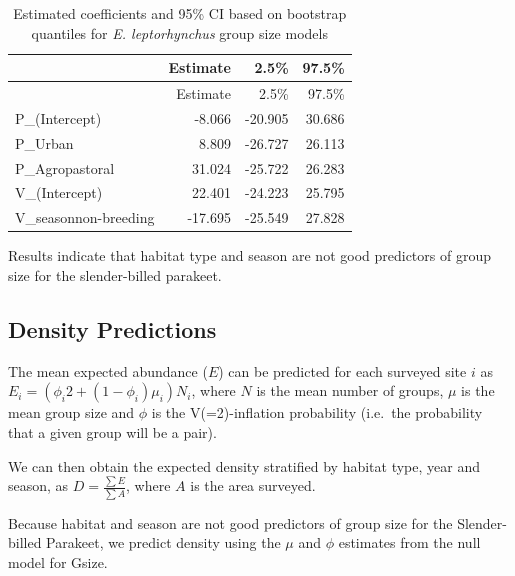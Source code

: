 \documentclass[]{article}
\begin{document}
\begin{longtable}[]{@{}lrrr@{}}
\caption{Estimated coefficients and 95\% CI based on bootstrap quantiles
for \textit{E. leptorhynchus} group size models}\tabularnewline
\toprule
& Estimate & 2.5\% & 97.5\%\tabularnewline
\midrule
\endfirsthead
\toprule
& Estimate & 2.5\% & 97.5\%\tabularnewline
\midrule
\endhead
P\_(Intercept) & -8.066 & -20.905 & 30.686\tabularnewline
P\_Urban & 8.809 & -26.727 & 26.113\tabularnewline
P\_Agropastoral & 31.024 & -25.722 & 26.283\tabularnewline
V\_(Intercept) & 22.401 & -24.223 & 25.795\tabularnewline
V\_seasonnon-breeding & -17.695 & -25.549 & 27.828\tabularnewline
\bottomrule
\end{longtable}

Results indicate that habitat type and season are not good predictors of
group size for the slender-billed parakeet.

\subsection{Density Predictions}\label{density-predictions-1}

The mean expected abundance (\(E\)) can be predicted for each surveyed
site \(i\) as \(E_{i} = (\phi_{i} 2 + (1 - \phi_{i})\mu_{i})N_{i}\),
where \(N\) is the mean number of groups, \(\mu\) is the mean group size
and \(\phi\) is the V(=2)-inflation probability (i.e.~the probability
that a given group will be a pair).

We can then obtain the expected density stratified by habitat type, year
and season, as \(D = \frac{\sum E}{\sum A}\), where \(A\) is the area
surveyed.

Because habitat and season are not good predictors of group size for the
Slender-billed Parakeet, we predict density using the \(\mu\) and
\(\phi\) estimates from the null model for Gsize.
\end{document}
